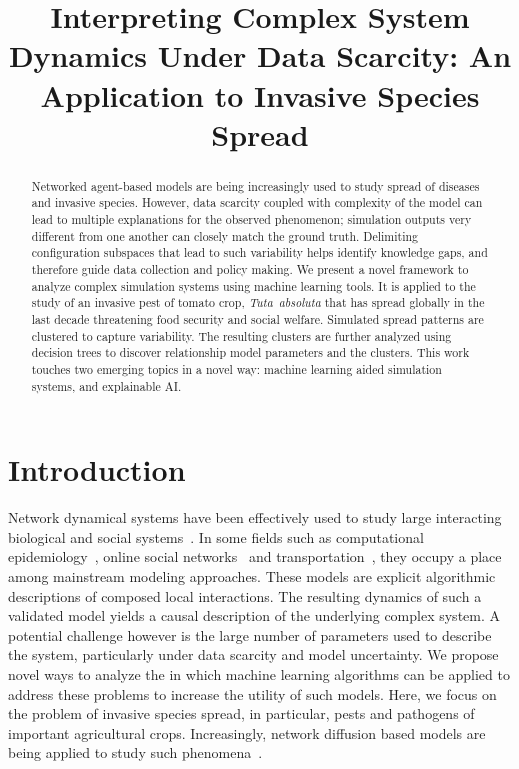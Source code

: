 \documentclass{article}
\title{Interpreting Complex System Dynamics Under Data Scarcity: An
Application to Invasive Species Spread}
\begin{document}
\maketitle

\begin{abstract}
Networked agent-based models are being increasingly used to study spread of
diseases and invasive species. However, data scarcity coupled with
complexity of the model can lead to multiple explanations for the observed
phenomenon; simulation outputs very different from one another can closely
match the ground truth. Delimiting configuration subspaces that lead to
such variability helps identify knowledge gaps, and therefore guide data
collection and policy making. We present a novel framework to analyze
complex simulation systems using machine learning tools. It is applied to
the study of an invasive pest of tomato crop, \emph{Tuta~absoluta} that has
spread globally in the last decade threatening food security and social
welfare. Simulated spread patterns are clustered to capture variability.
The resulting clusters are further analyzed using decision trees to
discover relationship model parameters and the clusters. This work touches two emerging
topics in a novel way: machine learning aided simulation systems, and
explainable AI.
\end{abstract}

\section{Introduction}
Network dynamical systems have been effectively used to study large
interacting biological and social systems~\cite{adiga2018graphical}. In
some fields such as computational epidemiology~\cite{eubank2004modelling},
online social networks~\cite{guille2013information} and
transportation~\cite{transims}, they occupy a place among mainstream
modeling approaches.  These models are explicit algorithmic descriptions of
composed local interactions. The resulting dynamics of such a validated
model yields a causal description of the underlying complex system. A
potential challenge however is the large number of parameters used to
describe the system, particularly under data scarcity and model
uncertainty.  We propose novel ways to analyze the in which machine
learning algorithms can be applied to address these problems to increase
the utility of such models.  Here, we focus on the problem of invasive
species spread, in particular, pests and pathogens of important
agricultural crops.  Increasingly, network diffusion based models are being
applied to study such
phenomena~\cite{carrasco2010unveiling,nopsa2015ecological}.
\end{document}
